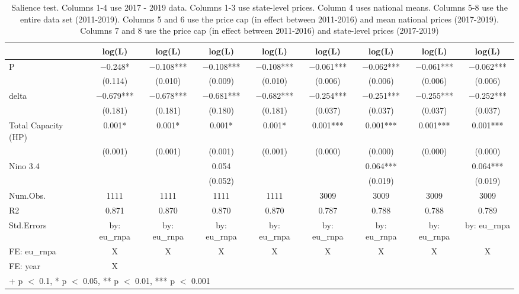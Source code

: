 \begin{table}

\caption{\label{tab:}Salience test.
             Columns 1-4 use 2017 - 2019 data.
             Columns 1-3 use state-level prices. Column 4 uses national means.
             Columns 5-8 use the entire data set (2011-2019).
             Columns 5 and 6 use the price cap (in effect between 2011-2016) and mean national prices (2017-2019).
             Columns 7 and 8 use the price cap (in effect between 2011-2016) and state-level prices (2017-2019)}
\centering
\begin{tabular}[t]{lcccccccc}
\toprule
  & log(L) & log(L)  & log(L)   & log(L)    & log(L)     & log(L)      & log(L)       & log(L)       \\
\midrule
P & \num{-0.248}* & \num{-0.108}*** & \num{-0.108}*** & \num{-0.108}*** & \num{-0.061}*** & \num{-0.062}*** & \num{-0.061}*** & \num{-0.062}***\\
 & (\num{0.114}) & (\num{0.010}) & (\num{0.009}) & (\num{0.010}) & (\num{0.006}) & (\num{0.006}) & (\num{0.006}) & (\num{0.006})\\
delta & \num{-0.679}*** & \num{-0.678}*** & \num{-0.681}*** & \num{-0.682}*** & \num{-0.254}*** & \num{-0.251}*** & \num{-0.255}*** & \num{-0.252}***\\
 & (\num{0.181}) & (\num{0.181}) & (\num{0.180}) & (\num{0.181}) & (\num{0.037}) & (\num{0.037}) & (\num{0.037}) & (\num{0.037})\\
Total Capacity (HP) & \num{0.001}* & \num{0.001}* & \num{0.001}* & \num{0.001}* & \num{0.001}*** & \num{0.001}*** & \num{0.001}*** & \num{0.001}***\\
 & (\num{0.001}) & (\num{0.001}) & (\num{0.001}) & (\num{0.001}) & (\num{0.000}) & (\num{0.000}) & (\num{0.000}) & (\num{0.000})\\
Nino 3.4 &  &  & \num{0.054} &  &  & \num{0.064}*** &  & \num{0.064}***\\
 &  &  & (\num{0.052}) &  &  & (\num{0.019}) &  & (\num{0.019})\\
\midrule
Num.Obs. & \num{1111} & \num{1111} & \num{1111} & \num{1111} & \num{3009} & \num{3009} & \num{3009} & \num{3009}\\
R2 & \num{0.871} & \num{0.870} & \num{0.870} & \num{0.870} & \num{0.787} & \num{0.788} & \num{0.788} & \num{0.789}\\
Std.Errors & by: eu\_rnpa & by: eu\_rnpa & by: eu\_rnpa & by: eu\_rnpa & by: eu\_rnpa & by: eu\_rnpa & by: eu\_rnpa & by: eu\_rnpa\\
FE: eu_rnpa & X & X & X & X & X & X & X & X\\
FE: year & X &  &  &  &  &  &  & \\
\bottomrule
\multicolumn{9}{l}{\rule{0pt}{1em}+ p $<$ 0.1, * p $<$ 0.05, ** p $<$ 0.01, *** p $<$ 0.001}\\
\end{tabular}
\end{table}
